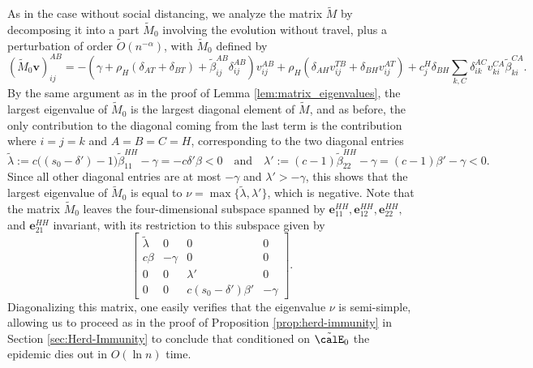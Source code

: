 \documentclass[11pt]{article}
\begin{document}
As in the case without social distancing, we analyze the matrix $\tilde M$  by decomposing it into a part $\tilde M_0$ involving the evolution without travel, plus a perturbation of order $\tilde O(n^{-\alpha})$, with $\tilde M_0$ defined by
\[
(\tilde M_0 \mathbf v)_{ij}^{AB}=
 -\left(\gamma+\rho_H(\delta_{AT}+\delta_{BT})+\tilde\beta_{ij}^{AB} \delta_{ij}^{AB}\right)v_{ij}^{AB}
+\rho_H\left(\delta_{AH}v_{ij}^{T B}+\delta_{BH}v_{ij}^{AT}\right)
+ c_j^H\delta_{BH}\sum_{k,C}\delta_{ik}^{AC}v_{ki}^{CA}{\tilde\beta_{ki}^{CA}}.
\]
By the same argument as in the proof of Lemma \ref{lem:matrix_eigenvalues}, the largest eigenvalue of $\tilde M_0$ is 
the largest diagonal element of $\tilde M$, and as before, the only contribution to the diagonal coming from the last term is the
contribution where $i=j=k$ and $A=B=C=H$, corresponding to the two diagonal entries
$$
\tilde\lambda:=c\big((s_0 - \delta')-1\big)\tilde\beta_{11}^{HH}-\gamma=-c\delta'\beta<0
\quad\text{and}\quad
\lambda':=(c-1)\tilde\beta_{22}^{HH}-\gamma=(c-1)\beta'-\gamma<0.
$$
Since all other diagonal entries are at most $-\gamma$ and $\lambda'>-\gamma$, this shows that the largest eigenvalue of $\tilde M_0$ is equal to $\nu=\max\{\tilde\lambda,\lambda'\}$, which is negative.  
Note that the matrix $\tilde M_0$ leaves the 
four-dimensional subspace spanned by $\mathbf e_{11}^{HH}, \mathbf e_{12}^{HH}, \mathbf e_{22}^{HH},$ and $\mathbf e_{21}^{HH}$  invariant, with its restriction to this subspace given by
\begin{equation}\label{M0-restricted}
    \begin{bmatrix}
        \tilde \lambda & 0 & 0 & 0 \\
        c\beta & -\gamma & 0 & 0 \\
        0 & 0 & \lambda' & 0 \\
        0 & 0 & c(s_0-\delta')\beta' & - \gamma
    \end{bmatrix}.
\end{equation}
Diagonalizing this matrix, one easily verifies that the eigenvalue
$\nu$ is semi-simple, allowing us to
proceed as in the proof of Proposition \ref{prop:herd-immunity} in Section \ref{sec:Herd-Immunity} to conclude that
 conditioned on $\tilde \calE_0$ the epidemic dies out in $O(\ln n)$ time. 
 
 
\end{document}
